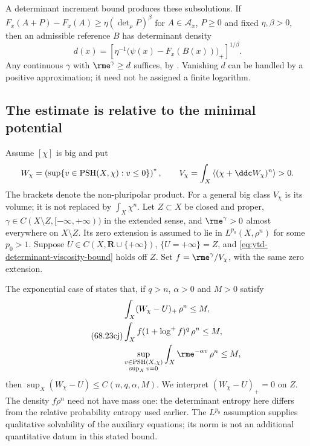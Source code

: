 A determinant increment bound produces these subsolutions. If
$F_x(A+P)-F_x(A)\geq\eta(\det_\rho P)^\beta$ for $A\in\mathcal A_x$,
$P\geq0$ and fixed $\eta,\beta>0$, then an admissible reference
$B$ has determinant density
\[
 d(x)=\left[\eta^{-1}\bigl(\psi(x)-F_x(B(x))\bigr)_+\right]^{1/\beta}.
\]
Any continuous $\gamma$ with $\rme^\gamma\geq d$ suffices,
by \cite[Proposition~2.8]{FangMaWu26DeterminantalV1}.
Vanishing $d$ can be handled by a positive approximation; it need
not be assigned a finite logarithm.

\subsection{The estimate is relative to the minimal potential}
\label{sec:ytd-determinantal-relative-estimate}

Assume $[\chi]$ is big and put
\[
 W_\chi=\left(\sup\{v\in\operatorname{PSH}(X,\chi):v\leq0\}\right)^*,
 \qquad V_\chi=\int_X\left\langle(\chi+\ddc W_\chi)^n\right\rangle>0.
\]
The brackets denote the non-pluripolar product. For a general big
class $V_\chi$ is its volume; it is not replaced by
$\int_X\chi^n$. Let $Z\subset X$ be closed and proper,
$\gamma\in C(X\setminus Z,[-\infty,+\infty))$ in the extended sense,
and $\rme^\gamma>0$ almost everywhere on $X\setminus Z$.
Its zero extension is assumed to lie in $L^{p_0}(X,\rho^n)$ for
some $p_0>1$. Suppose
$U\in C(X,\mathbf R\cup\{+\infty\})$, $\{U=+\infty\}=Z$,
and \eqref{eq:ytd-determinant-viscosity-bound} holds off $Z$.
Set $f=\rme^\gamma/V_\chi$, with the same zero extension.

The exponential case of
\cite[Theorem~3.4]{FangMaWu26DeterminantalV1} states that, if
$q>n$, $\alpha>0$ and $M>0$ satisfy
\[
\tag{68.23cj}\label{eq:ytd-determinantal-entropy-data}
\begin{aligned}
 &\int_X(W_\chi-U)_+\,\rho^n\leq M,\\
 &\int_X f(1+\log^+f)^q\,\rho^n\leq M,\\
 &\sup_{\substack{v\in\operatorname{PSH}(X,\chi)\\\sup_Xv=0}}
       \int_X\rme^{-\alpha v}\,\rho^n\leq M,
\end{aligned}
\]
then $\sup_X(W_\chi-U)\leq C(n,q,\alpha,M)$.
We interpret $(W_\chi-U)_+=0$ on $Z$.
The density $f\rho^n$ need not have mass one: the determinant
entropy here differs from the relative probability entropy used
earlier. The $L^{p_0}$ assumption supplies qualitative solvability
of the auxiliary equations; its norm is not an additional quantitative
datum in this stated bound.


